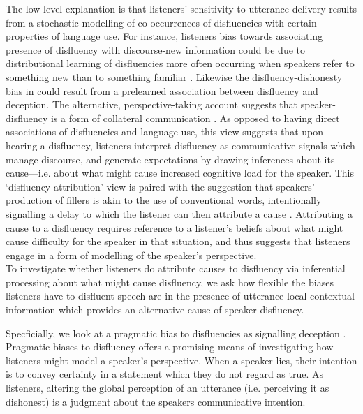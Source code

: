 \documentclass[man]{apa6}
\begin{document}




The low-level explanation is that listeners' sensitivity to utterance delivery results from a stochastic modelling of co-occurrences of disfluencies with certain properties of language use. 
For instance, listeners bias towards associating presence of disfluency with discourse-new information could be due to distributional learning of disfluencies more often occurring when speakers refer to something new than to something familiar \citep{Arnold2004, Barr2001}. Likewise the disfluency-dishonesty bias in \citet{Loy2016} could result from a prelearned association between disfluency and deception.
The alternative, perspective-taking account suggests that speaker-disfluency is a form of collateral communication \citep{Clark1996}. 
As opposed to having direct associations of disfluencies and language use, this view suggests that upon hearing a disfluency, listeners interpret disfluency as communicative signals which manage discourse, and generate expectations by drawing inferences about its cause---i.e. about what might cause increased cognitive load for the speaker. 
This `disfluency-attribution' view is paired with the suggestion that speakers' production of fillers is akin to the use of conventional words, intentionally signalling a delay to which the listener can then attribute a cause \citep{Clark2002}. 
Attributing a cause to a disfluency requires reference to a listener's beliefs about what might cause difficulty for the speaker in that situation, and thus suggests that listeners engage in a form of modelling of the speaker's perspective.\\

To investigate whether listeners do attribute causes to disfluency via inferential processing about what might cause disfluency, we ask how flexible the biases listeners have to disfluent speech are in the presence of utterance-local contextual information which provides an alternative cause of speaker-disfluency.




Specficially, we look at a pragmatic bias to disfluencies as signalling deception \citep{Loy2016}. 
Pragmatic biases to disfluency offers a promising means of investigating how listeners might model a speaker's perspective. 
When a speaker lies, their intention is to convey certainty in a statement which they do not regard as true. 
As listeners, altering the global perception of an utterance (i.e. perceiving it as dishonest) is a judgment about the speakers communicative intention. 
\end{document}
